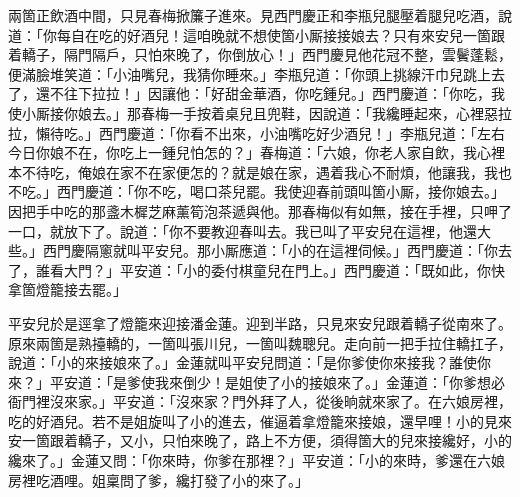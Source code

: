 兩箇正飲酒中間，只見春梅掀簾子進來。見西門慶正和李瓶兒腿壓着腿兒吃酒，說道：「你每自在吃的好酒兒！這咱晚就不想使箇小厮接接娘去？只有來安兒一箇跟着轎子，隔門隔戶，只怕來晚了，你倒放心！」{}西門慶見他花冠不整，雲鬢蓬鬆，便滿臉堆笑道：「小油嘴兒，我猜你睡來。」李瓶兒道：「你頭上挑線汗巾兒跳上去了，還不往下拉拉！」因讓他：「好甜金華酒，你吃鍾兒。」西門慶道：「你吃，我使小厮接你娘去。」那春梅一手按着桌兒且兜鞋，因說道：「我纔睡起來，心裡惡拉拉，懶待吃。」西門慶道：「你看不出來，小油嘴吃好少酒兒！」李瓶兒道：「左右今日你娘不在，你吃上一鍾兒怕怎的？」春梅道：「六娘，你老人家自飲，我心裡本不待吃，俺娘在家不在家便怎的？就是娘在家，遇着我心不耐煩，他讓我，我也不吃。」西門慶道：「你不吃，喝口茶兒罷。我使迎春前頭叫箇小厮，接你娘去。」因把手中吃的那盞木樨芝麻薰筍泡茶遞與他。那春梅似有如無，接在手裡，只呷了一口，就放下了。說道：「你不要教迎春叫去。我已叫了平安兒在這裡，他還大些。」西門慶隔窻就叫平安兒。那小厮應道：「小的在這裡伺候。」西門慶道：「你去了，誰看大門？」平安道：「小的委付棋童兒在門上。」西門慶道：「既如此，你快拿箇燈籠接去罷。」

平安兒於是逕拿了燈籠來迎接潘金蓮。迎到半路，只見來安兒跟着轎子從南來了。原來兩箇是熟擡轎的，一箇叫張川兒，一箇叫魏聰兒。走向前一把手拉住轎扛子，說道：「小的來接娘來了。」金蓮就叫平安兒問道：「是你爹使你來接我？誰使你來？」平安道：「是爹使我來倒少！是姐使了小的接娘來了。」金蓮道：「你爹想必衙門裡沒來家。」{}平安道：「沒來家？門外拜了人，從後晌就來家了。在六娘房裡，吃的好酒兒。若不是姐旋叫了小的進去，催逼着拿燈籠來接娘，還早哩！小的見來安一箇跟着轎子，又小，只怕來晚了，路上不方便，須得箇大的兒來接纔好，小的纔來了。」金蓮又問：「你來時，你爹在那裡？」平安道：「小的來時，爹還在六娘房裡吃酒哩。姐稟問了爹，纔打發了小的來了。」

